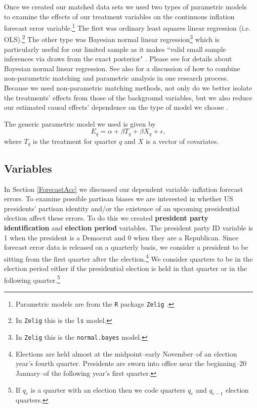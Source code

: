 \documentclass[a4paper]{article}
\begin{document}
Once we created our matched data sets we used two types of parametric models to examine the effects of our treatment variables on the continuous inflation forecast error variable.\footnote{Parametric models are from the \texttt{R} package \texttt{Zelig} \citep{Zelig2012}.} The first was ordinary least squares linear regression (i.e. OLS).\footnote{In {\tt{Zelig}} this is the {\tt{ls}} model.} The other type was Bayesian normal linear regression\footnote{In {\tt{Zelig}} this is the {\tt{normal.bayes}} model.} which is particularly useful for our limited sample as it makes ``valid small sample inferences via draws from the exact posterior" \citep[][38]{Zelig2012}. Please see \cite{Goodrich2007} for details about Bayesian normal linear regression.  See also \cite{Imai2008} for a discussion of how to combine non-parametric matching and parametric analysis in one research process. Because we used non-parametric matching methods, not only do we better isolate the treatments' effects from those of the background variables, but we also reduce our estimated causal effects' dependence on the type of model we choose \cite[200--201]{Ho2007}.

The generic parametric model we used is given by
%
\begin{equation}
    E_{q} = \alpha + \beta T_{q} + \beta X_{q} + \epsilon,
\end{equation}
%
where $T_{q}$ is the treatment for quarter $q$ and $X$ is a vector of covariates. 

\subsection{Variables}

In Section \ref{ForecastAcc} we discussed our dependent variable--inflation forecast errors. To examine possible partisan biases we are interested in whether US presidents' partisan identity and/or the existence of an upcoming presidential election affect these errors. To do this we created {\bf{president party identification}} and {\bf{election period}} variables. The president party ID variable is 1 when the president is a Democrat and 0 when they are a Republican. Since forecast error data is released on a quarterly basis, we consider a president to be sitting from the first quarter after the election.\footnote{Elections are held almost at the midpoint--early November--of an election year's fourth quarter. Presidents are sworn into office near the beginning--20 January--of the following year's first quarter.} We consider quarters to be in the election period either if the presidential election is held in that quarter or in the following quarter.\footnote{If $q_{e}$ is a quarter with an election then we code quarters $q_{e}$ and $q_{e-1}$ election quarters.}
\end{document}
